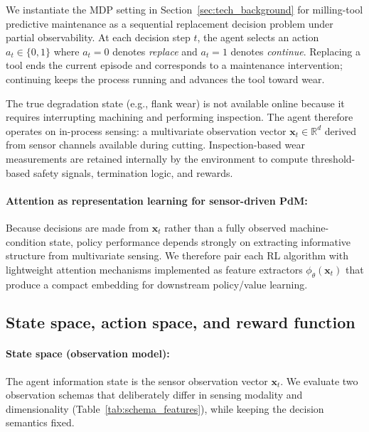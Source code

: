 \documentclass[sn-vancouver-num]{sn-jnl}%
\begin{document}
We instantiate the MDP setting in Section~\ref{sec:tech_background} for milling-tool predictive maintenance as a sequential replacement decision problem under partial observability. At each decision step $t$, the agent selects an action $a_t\in\{0,1\}$ where $a_t=0$ denotes \emph{replace} and $a_t=1$ denotes \emph{continue}. Replacing a tool ends the current episode and corresponds to a maintenance intervention; continuing keeps the process running and advances the tool toward wear.

The true degradation state (e.g., flank wear) is not available online because it requires interrupting machining and performing inspection. The agent therefore operates on in-process sensing: a multivariate observation vector $\mathbf{x}_t\in\mathbb{R}^d$ derived from sensor channels available during cutting. Inspection-based wear measurements are retained internally by the environment to compute threshold-based safety signals, termination logic, and rewards.

\paragraph{Attention as representation learning for sensor-driven PdM:}
Because decisions are made from $\mathbf{x}_t$ rather than a fully observed machine-condition state, policy performance depends strongly on extracting informative structure from multivariate sensing. We therefore pair each RL algorithm with lightweight attention mechanisms implemented as feature extractors $\phi_\theta(\mathbf{x}_t)$ that produce a compact embedding for downstream policy/value learning.

\subsection{State space, action space, and reward function}
\label{sec:mdp_components}

\paragraph{State space (observation model):}
The agent information state is the sensor observation vector $\mathbf{x}_t$. We evaluate two observation schemas that deliberately differ in sensing modality and dimensionality (Table~\ref{tab:schema_features}), while keeping the decision semantics fixed.
\end{document}
